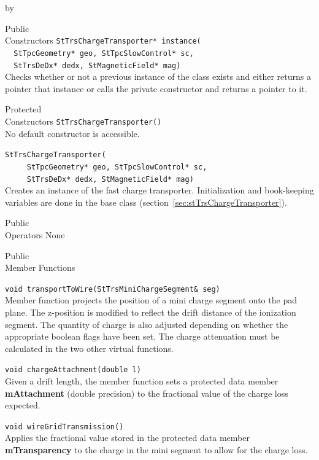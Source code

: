 \documentclass[twoside]{article}
\newcommand{\entrylabel}[1]{\mbox{\textbf{{#1}}}\hfil}%
\newenvironment{entry}
{\begin{list}{}%
    {\renewcommand{\makelabel}{\entrylabel}%
     \setlength{\labelwidth}{90pt}%
     \setlength{\leftmargin}{\labelwidth}
     \advance\leftmargin by \labelsep%
      }%
    }%
  {\end{list}}
\newcommand{\Entrylabel}[1]%
{\raisebox{0pt}[1ex][0pt]{\makebox[\labelwidth][l]%
    {\parbox[t]{\labelwidth}{\hspace{0pt}\textbf{{#1}}}}}}
\newenvironment{Entry}%
{\renewcommand{\entrylabel}{\Entrylabel}\begin{entry}}%
  {\end{entry}}
\begin{document}
\begin{Entry}
\item[Public \\ Constructors]
   \verb+StTrsChargeTransporter* instance(+\\
   \verb+  StTpcGeometry* geo, StTpcSlowControl* sc,+\\
   \verb+  StTrsDeDx* dedx, StMagneticField* mag)+\\
   Checks whether or not a previous instance of the class exists and
   either returns a pointer that instance or calls the private constructor
   and returns a pointer to it.

\item[Protected \\ Constructors]
   \verb+StTrsChargeTransporter()+\\
   No default constructor is accessible.

   \verb+StTrsChargeTransporter(+\\
   \verb+     StTpcGeometry* geo, StTpcSlowControl* sc,+\\
   \verb+     StTrsDeDx* dedx, StMagneticField* mag)+\\
   Creates an instance of the fast charge transporter.  Initialization and
   book-keeping variables are done in the base class 
   (section~\ref{sec:stTrsChargeTransporter}).

\item[Public \\ Operators]
   None

\item[Public \\ Member Functions]

  \verb+void transportToWire(StTrsMiniChargeSegment& seg)+\\
  Member function projects the position of a mini charge segment
  onto the pad plane.  The z-position is modified to reflect the
  drift distance of the ionization segment.  The quantity of charge
  is also adjusted depending on whether 
  the appropriate boolean flags have been set.  The charge attenuation
  must be calculated in the two other virtual functions. 

  \verb+void chargeAttachment(double l)+\\
  Given a drift length, the member function sets a protected data
  member {\bf mAttachment} (double precision) to the fractional
  value of the charge loss expected.
 
  \verb+void wireGridTransmission()+\\
  Applies the fractional value stored in the protected data member
  {\bf mTransparency} to the charge in the mini segment to allow
  for the charge loss.


\end{Entry}
\end{document}

